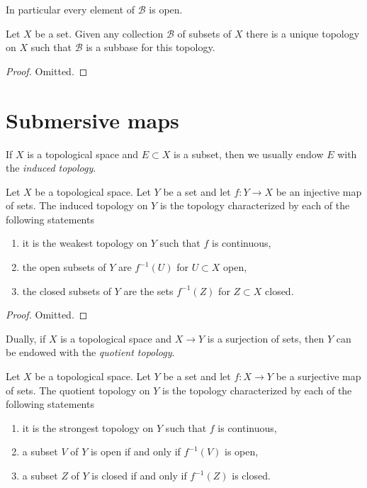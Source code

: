 \noindent
In particular every element of $\mathcal{B}$ is open.

\begin{lemma}
\label{lemma-subbase}
Let $X$ be a set. Given any collection $\mathcal{B}$ of subsets of $X$
there is a unique topology on $X$ such that $\mathcal{B}$ is a subbase
for this topology.
\end{lemma}

\begin{proof}
Omitted.
\end{proof}





\section{Submersive maps}
\label{section-submersive}

\noindent
If $X$ is a topological space and $E \subset X$ is a subset, then
we usually endow $E$ with the {\it induced topology}.

\begin{lemma}
\label{lemma-induced}
Let $X$ be a topological space. Let $Y$ be a set and let
$f : Y \to X$ be an injective map of sets. The induced
topology on $Y$ is the topology characterized by
each of the following statements
\begin{enumerate}
\item it is the weakest topology on $Y$ such that $f$ is continuous,
\item the open subsets of $Y$ are $f^{-1}(U)$ for $U \subset X$ open,
\item the closed subsets of $Y$ are the sets $f^{-1}(Z)$ for $Z \subset X$
closed.
\end{enumerate}
\end{lemma}

\begin{proof}
Omitted.
\end{proof}

\noindent
Dually, if $X$ is a topological space and $X \to Y$ is a surjection of
sets, then $Y$ can be endowed with the {\it quotient topology}.

\begin{lemma}
\label{lemma-quotient}
Let $X$ be a topological space. Let $Y$ be a set and let $f : X \to Y$
be a surjective map of sets. The quotient topology on $Y$ is the
topology characterized by each of the following statements
\begin{enumerate}
\item it is the strongest topology on $Y$ such that $f$ is continuous,
\item a subset $V$ of $Y$ is open if and only if $f^{-1}(V)$ is open,
\item a subset $Z$ of $Y$ is closed if and only if $f^{-1}(Z)$ is closed.
\end{enumerate}
\end{lemma}

